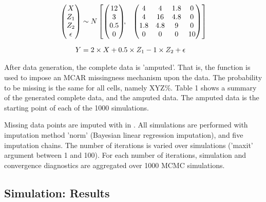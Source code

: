 \documentclass[article]{jss}
\newcommand{\fct}[1]{\code{#1()}}
\begin{document}
\begin{align*}
\begin{pmatrix}X\\
Z_{1}\\
Z_{2}\\
\epsilon
\end{pmatrix} &\sim  N
\begin{bmatrix}
\begin{pmatrix}
12\\
3\\
0.5\\
0
\end{pmatrix}\!\!,&
\begin{pmatrix}
4 & 4 & 1.8 & 0\\
4 & 16 & 4.8 & 0\\
1.8 & 4.8 & 9 & 0\\
0 & 0 & 0 & 10
\end{pmatrix}
\end{bmatrix}\\[2\jot]
Y &=  2 \times X + 0.5 \times Z_1 - 1 \times Z_2 + \epsilon
\end{align*}

After data generation, the complete data is 'amputed'. That is, the  function \fct{ampute} is used to impose an MCAR missingness mechanism upon the data. The probability to be missing is the same for all cells, namely XYZ\%. Table 1 shows a summary of the generated complete data, and the amputed data. The amputed data is the starting point of each of the 1000 simulations.

Missing data points are imputed with  in . All simulations are performed with imputation method 'norm' (Bayesian linear regression imputation), and five imputation chains. The number of iterations is varied over simulations ('maxit' argument between 1 and 100). For each number of iterations, simulation and convergence diagnostics are aggregated over 1000 MCMC simulations. 


\subsection{Simulation: Results}
\end{document}
